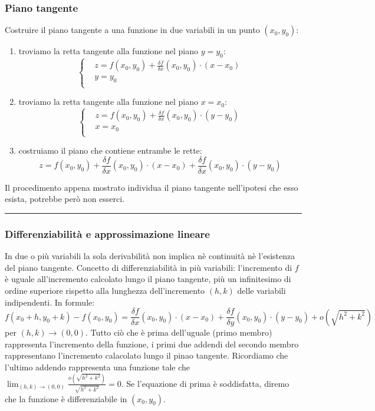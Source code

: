 \subsubsection*{Piano tangente}
Costruire il piano tangente a una funzione in due variabili in un punto $(x_0, y_0)$:
\begin{enumerate}
    \item troviamo la retta tangente alla funzione nel piano $y=y_0$:
    \[
        \begin{cases}
            &z = f(x_0, y_0) + \frac{\delta f}{\delta x}(x_0, y_0) \cdot (x-x_0)\\
            &y=y_0 \\
        \end{cases}
    \]
    \item troviamo la retta tangente alla funzione nel piano $x=x_0$:
    \[
        \begin{cases}
            &z = f(x_0, y_0) + \frac{\delta f}{\delta x}(x_0, y_0) \cdot (y-y_0)\\
            &x=x_0 \\
        \end{cases}
    \]
    \item costruiamo il piano che contiene entrambe le rette:
    \[
        z = f(x_0, y_0) + \frac{\delta f}{\delta x}(x_0, y_0) \cdot (x-x_0) + \frac{\delta f}{\delta x}(x_0, y_0) \cdot (y-y_0)
    \]
\end{enumerate}
Il procedimento appena mostrato individua il piano tangente nell'ipotesi che esso esista, potrebbe però non esserci.\newline
\rule{\textwidth}{0.4pt}
\subsubsection*{Differenziabilità e approssimazione lineare}
In due o più variabili la sola derivabilità non implica nè continuità nè l'esistenza del piano tangente.\newline
Concetto di differenziabilità in più variabili: l'incremento di $f$ è uguale all'incremento calcolato lungo il piano tangente, più un infinitesimo di ordine superiore rispetto alla lunghezza dell'incremento $(h,k)$ delle variabili indipendenti. In formule:
\[
    f(x_0 + h, y_0 + k) - f(x_0, y_0) = \frac{\delta f}{\delta x} (x_0,y_0) \cdot (x-x_0) + \frac{\delta f}{\delta y}(x_0, y_0) \cdot (y-y_0) + o(\sqrt{h^2 + k^2})
\]
per $(h,k) \rightarrow  (0,0)$.\newline
Tutto ciò che è prima dell'uguale (primo membro) rappresenta l'incremento della funzione, i primi due addendi del secondo membro rappresentano l'incremento calacolato lungo il pinao tangente. Ricordiamo che l'ultimo addendo rappresenta una funzione tale che $\lim_{(h,k)\rightarrow (0,0)}\frac{o(\sqrt{h^2 + k^2})}{\sqrt{h^2 + k^2}} = 0$.\newline
Se l'equazione di prima è soddisfatta, diremo che la funzione è differenziabile in $(x_0, y_0)$.\newline

